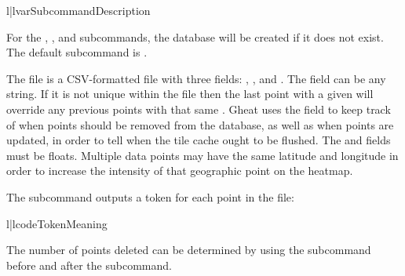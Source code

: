 \documentclass{manual}
\begin{document}
\begin{tableii}{l|l}{var}{Subcommand}{Description}
\end{tableii}

For the , , and  subcommands, the database will
be created if it does not exist. The default subcommand is . 

The  file is a CSV-formatted file with three fields:
, , and . The  field
can be any string. If it is not unique within the  file then
the last point with a given  will override any previous points
with that same . Gheat uses the  field to keep
track of when points should be removed from the database, as well as when
points are updated, in order to tell when the tile cache ought to be flushed.
The  and  fields must be floats. Multiple data
points may have the same latitude and longitude in order to increase the
intensity of that geographic point on the heatmap.

The  subcommand outputs a token for each point in the
 file:

\begin{tableii}{l|l}{code}{Token}{Meaning}
\end{tableii}

The number of points deleted can be determined by using the 
subcommand before and after the  subcommand.
\end{document}

